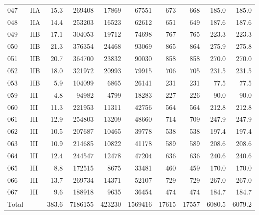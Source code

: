 \begin{table}[H]
\begin{tabular}{llr rrr rr rr}
047 & IIA & 15.3 & 269408 & 17869 & 67551 & 673 & 668 & 185.0 & 185.0 \\
048 & IIA & 14.4 & 253203 & 16523 & 62612 & 651 & 649 & 187.6 & 187.6 \\
049 & IIB & 17.1 & 304053 & 19712 & 74698 & 767 & 765 & 223.3 & 223.3 \\
050 & IIB & 21.3 & 376354 & 24468 & 93069 & 865 & 864 & 275.9 & 275.8 \\
051 & IIB & 20.7 & 364700 & 23832 & 90030 & 858 & 858 & 270.0 & 270.0 \\
052 & IIB & 18.0 & 321972 & 20993 & 79915 & 706 & 705 & 231.5 & 231.5 \\
053 & IIB & 5.9 & 104099 & 6865 & 26141 & 231 & 231 & 77.5 & 77.5 \\
059 & III & 4.8 & 94982 & 4799 & 18283 & 227 & 226 & 90.0 & 90.0 \\
060 & III & 11.3 & 221953 & 11311 & 42756 & 564 & 564 & 212.8 & 212.8 \\
061 & III & 12.9 & 254803 & 13209 & 48660 & 714 & 709 & 247.9 & 247.9 \\
062 & III & 10.5 & 207687 & 10465 & 39778 & 538 & 538 & 197.4 & 197.4 \\
063 & III & 10.9 & 214685 & 10822 & 41178 & 589 & 589 & 208.6 & 208.6 \\
064 & III & 12.4 & 244547 & 12478 & 47204 & 636 & 636 & 240.6 & 240.6 \\
065 & III & 8.8 & 172515 & 8675 & 33481 & 460 & 459 & 170.0 & 170.0 \\
066 & III & 13.7 & 269734 & 14371 & 52107 & 729 & 729 & 267.0 & 267.0 \\
067 & III & 9.6 & 188918 & 9635 & 36454 & 474 & 474 & 184.7 & 184.7 \\
\midrule
Total & & 383.6 & 7186155 & 423230 & 1569416 & 17615 & 17557 & 6080.5 & 6079.2 \\
\bottomrule
\end{tabular}
\end{table}
